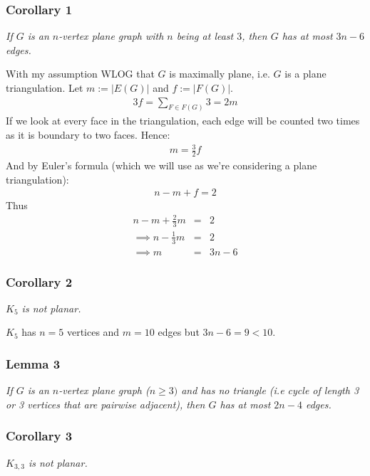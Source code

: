 		\subsubsection{Corollary 1} 
		\textit{If $G$ is an $n$-vertex plane graph with $n$ being at least $3$, then $G$ has at most $3n - 6$ edges.\\}
		
		With my assumption WLOG that $G$ is maximally plane, i.e. $G$ is a plane triangulation. Let $m := |E(G)|$ and $f := |F(G)|$.
		\begin{eqnarray}
			3f = \sum_{F \in F(G)} 3 = 2m
		\end{eqnarray}
		If we look at every face in the triangulation, each edge will be counted two times as it is boundary to two faces. Hence:
		\begin{eqnarray}
			m = \frac{3}{2} f
		\end{eqnarray}
		And by Euler's formula (which we will use as we're considering a plane triangulation):
		\begin{eqnarray}
			n - m + f = 2
		\end{eqnarray}
		Thus 
		\begin{eqnarray}
			n - m + \frac{2}{3}m &=& 2 \\
			\implies n - \frac{1}{3} m &=& 2 \\
			\implies m &=& 3n - 6
		\end{eqnarray}
		
		\subsubsection{Corollary 2}
		\textit{$K_5$ is not planar.\\}
		
		$K_5$ has $n = 5$ vertices and $m = 10$ edges but $3n - 6 = 9 < 10$.
		
		
		\subsubsection{Lemma 3}
		\textit{If $G$ is an $n$-vertex plane graph ($n \geq 3)$ and has no triangle (i.e cycle of length 3 or 3 vertices that are pairwise adjacent), then $G$ has at most $2n - 4$ edges.\\}
		
		\subsubsection{Corollary 3}
		\textit{$K_{3,3}$ is not planar.\\}
		
